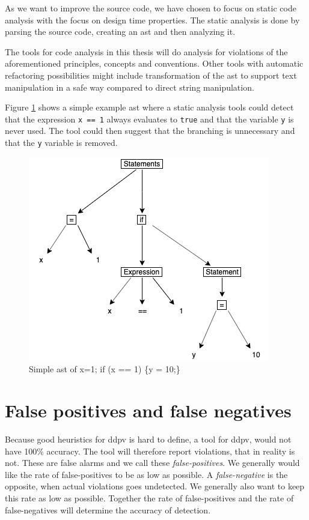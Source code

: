 \documentclass{report}
\begin{document}
As we want to improve the source code, we have chosen to focus on static code analysis with the focus on design time properties. The static analysis is done by parsing the source code, creating an \gls{ast} and then analyzing it.


The tools for code analysis in this thesis will do analysis for violations of the aforementioned principles, concepts and conventions. Other tools with automatic refactoring possibilities might include transformation of the \gls{ast} to support text manipulation in a safe way compared to direct string manipulation. 




Figure \ref{fig:ast} shows a simple example \gls{ast} where a static analysis tools could detect that the expression \texttt{x == 1} always evaluates to \texttt{true} and that the variable \texttt{y} is never used. The tool could then suggest that the branching is unnecessary and that the \texttt{y} variable is removed.  

\begin{figure}[h!]
	\centering
	\includegraphics[width=\linewidth/2]{report/images/ast.png}
	\caption{Simple \gls{ast} of x=1; if (x == 1) \{y = 10;\}}
	\label{fig:ast}
\end{figure}



\section{False positives and false negatives}
Because good heuristics for \gls{ddpv} is hard to define, a tool for \gls{ddpv}, would not have 100\% accuracy. The tool will therefore report violations, that in reality is not. These are false alarms and we call these \textit{false-positives}. We generally would like the rate of false-positives to be as low as possible. A \textit{false-negative} is the opposite, when actual violations goes undetected. We generally also want to keep this rate as low as possible. Together the rate of false-positives and the rate of false-negatives will determine the accuracy of detection. 
\end{document}
